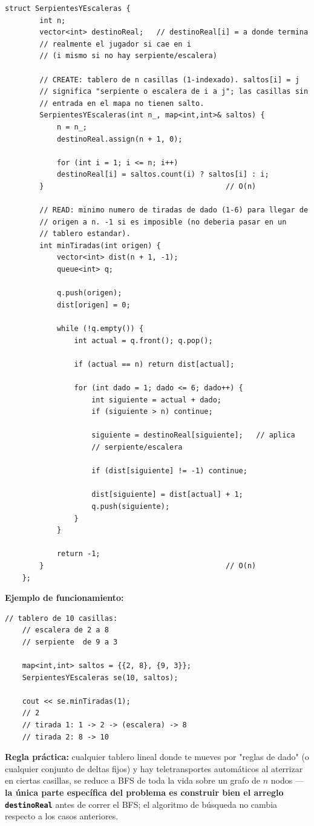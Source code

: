 \documentclass[10pt,a4paper,twocolumn]{article}
\begin{document}
\begin{lstlisting}[style=cpp]
	struct SerpientesYEscaleras {
		int n;
		vector<int> destinoReal;   // destinoReal[i] = a donde termina
		// realmente el jugador si cae en i
		// (i mismo si no hay serpiente/escalera)
		
		// CREATE: tablero de n casillas (1-indexado). saltos[i] = j
		// significa "serpiente o escalera de i a j"; las casillas sin
		// entrada en el mapa no tienen salto.
		SerpientesYEscaleras(int n_, map<int,int>& saltos) {
			n = n_;
			destinoReal.assign(n + 1, 0);
			
			for (int i = 1; i <= n; i++)
			destinoReal[i] = saltos.count(i) ? saltos[i] : i;
		}                                          // O(n)
		
		// READ: minimo numero de tiradas de dado (1-6) para llegar de
		// origen a n. -1 si es imposible (no deberia pasar en un
		// tablero estandar).
		int minTiradas(int origen) {
			vector<int> dist(n + 1, -1);
			queue<int> q;
			
			q.push(origen);
			dist[origen] = 0;
			
			while (!q.empty()) {
				int actual = q.front(); q.pop();
				
				if (actual == n) return dist[actual];
				
				for (int dado = 1; dado <= 6; dado++) {
					int siguiente = actual + dado;
					if (siguiente > n) continue;
					
					siguiente = destinoReal[siguiente];   // aplica
					// serpiente/escalera
					
					if (dist[siguiente] != -1) continue;
					
					dist[siguiente] = dist[actual] + 1;
					q.push(siguiente);
				}
			}
			
			return -1;
		}                                          // O(n)
	};
\end{lstlisting}

\textbf{Ejemplo de funcionamiento:}

\begin{lstlisting}[style=cpp]
	// tablero de 10 casillas:
	// escalera de 2 a 8
	// serpiente  de 9 a 3
	
	map<int,int> saltos = {{2, 8}, {9, 3}};
	SerpientesYEscaleras se(10, saltos);
	
	cout << se.minTiradas(1);
	// 2
	// tirada 1: 1 -> 2 -> (escalera) -> 8
	// tirada 2: 8 -> 10
\end{lstlisting}

\textbf{Regla práctica:} cualquier tablero lineal donde te mueves por
"reglas de dado" (o cualquier conjunto de deltas fijos) y hay
teletransportes automáticos al aterrizar en ciertas casillas, se
reduce a BFS de toda la vida sobre un grafo de $n$ nodos —
\textbf{la única parte específica del problema es construir bien el
	arreglo \texttt{destinoReal}} antes de correr el BFS; el algoritmo de
búsqueda no cambia respecto a los casos anteriores.
\end{document}
